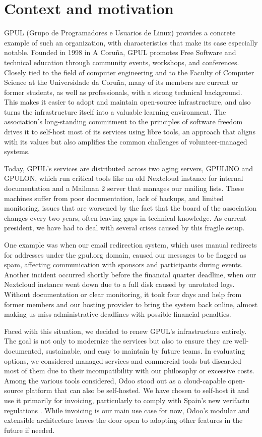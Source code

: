 \section{Context and motivation}

GPUL (Grupo de Programadores e Usuarios de Linux) \cite{gpul_web} provides a concrete example of such an organization, with characteristics that make its case especially notable. Founded in 1998 in A Coruña, GPUL promotes Free Software and technical education through community events, workshops, and conferences. Closely tied to the field of computer engineering and to the Faculty of Computer Science at the Universidade da Coruña, many of its members are current or former students, as well as professionals, with a strong technical background. This makes it easier to adopt and maintain open-source infrastructure, and also turns the infrastructure itself into a valuable learning environment. The association's long-standing commitment to the principles of software freedom drives it to self-host most of its services using libre tools, an approach that aligns with its values but also amplifies the common challenges of volunteer-managed systems.

Today, GPUL's services are distributed across two aging servers, GPULINO and GPULON, which run critical tools like an old Nextcloud instance for internal documentation and a Mailman 2 server that manages our mailing lists. These machines suffer from poor documentation, lack of backups, and limited monitoring, issues that are worsened by the fact that the board of the association changes every two years, often leaving gaps in technical knowledge. As current president, we have had to deal with several crises caused by this fragile setup.

One example was when our email redirection system, which uses manual redirects for addresses under the gpul.org domain, caused our messages to be flagged as spam, affecting communication with sponsors and participants during events. Another incident occurred shortly before the financial quarter deadline, when our Nextcloud instance went down due to a full disk caused by unrotated logs. Without documentation or clear monitoring, it took four days and help from former members and our hosting provider to bring the system back online, almost making us miss administrative deadlines with possible financial penalties.

Faced with this situation, we decided to renew GPUL's infrastructure entirely. The goal is not only to modernize the services but also to ensure they are well-documented, sustainable, and easy to maintain by future teams. In evaluating options, we considered managed services and commercial tools but discarded most of them due to their incompatibility with our philosophy or excessive costs. Among the various tools considered, Odoo \cite{odoo_web} stood out as a cloud-capable open-source platform that can also be self-hosted. We have chosen to self-host it and use it primarily for invoicing, particularly to comply with Spain's new \gls{verifactu} regulations \cite{BOE-A-2024-22138}. While invoicing is our main use case for now, Odoo's modular and extensible architecture leaves the door open to adopting other features in the future if needed.


